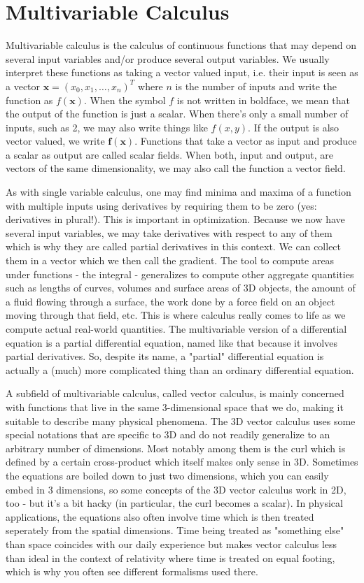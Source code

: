 \chapter{Multivariable Calculus}
Multivariable calculus is the calculus of continuous functions that may depend on several input variables and/or produce several output variables. We usually interpret these functions as taking a vector valued input, i.e. their input is seen as a vector  $\mathbf{x} = (x_0,x_1,\ldots,x_n)^T$ where $n$ is the number of inputs and write the function as $f(\mathbf{x})$. When the symbol $f$ is not written in boldface, we mean that the output of the function is just a scalar. When there's only a small number of inputs, such as 2, we may also write things like $f(x,y)$. If the output is also vector valued, we write $\mathbf{f(x)}$. Functions that take a vector as input and produce a scalar as output are called scalar fields. When both, input and output, are vectors of the same dimensionality, we may also call the function a vector field.

\medskip
As with single variable calculus, one may find minima and maxima of a function with multiple inputs using derivatives by requiring them to be zero (yes: derivatives in plural!). This is important in optimization. Because we now have several input variables, we may take derivatives with respect to any of them which is why they are called partial derivatives in this context. We can collect them in a vector which we then call the gradient. The tool to compute areas under functions - the integral - generalizes to compute other aggregate quantities such as lengths of curves, volumes and surface areas of 3D objects, the amount of a fluid flowing through a surface, the work done by a force field on an object moving through that field, etc. This is where calculus really comes to life as we compute actual real-world quantities. The multivariable version of a differential equation is a partial differential equation, named like that because it involves partial derivatives. So, despite its name, a "partial" differential equation is actually a (much) more complicated thing than an ordinary differential equation. 

\medskip
A subfield of multivariable calculus, called vector calculus, is mainly concerned with functions that live in the same 3-dimensional space that we do, making it suitable to describe many physical phenomena. The 3D vector calculus uses some special notations that are specific to 3D and do not readily generalize to an arbitrary number of dimensions. Most notably among them is the curl which is defined by a certain cross-product which itself makes only sense in 3D. Sometimes the equations are boiled down to just two dimensions, which you can easily embed in 3 dimensions, so some concepts of the 3D vector calculus  work in 2D, too - but it's a bit hacky (in particular, the curl becomes a scalar). In physical applications, the equations also often involve time which is then treated seperately from the spatial dimensions. Time being treated as "something else" than space coincides with our daily experience but makes vector calculus less than ideal in the context of relativity where time is treated on equal footing, which is why you often see different formalisms used there. 


